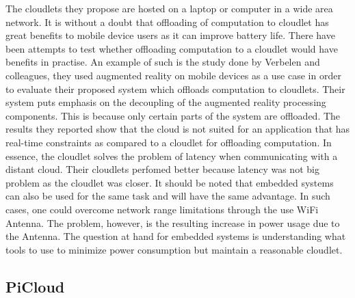 \noindent The cloudlets they propose are hosted on a laptop or computer in a wide area network. It is without a doubt that offloading of computation to cloudlet has great benefits to mobile device users as it can improve battery life. There have been attempts to test
whether offloading computation to a cloudlet would have benefits in practise. An example of such is the study done by Verbelen and colleagues\cite{RefWorks:93}, they used augmented reality on mobile devices as a use case in order to evaluate their proposed system which offloads computation to cloudlets. Their system puts emphasis on the decoupling of the augmented reality processing components.
This is because only certain parts of the system are offloaded. The results they reported show that the cloud is not suited for an application that has real-time constraints as compared to a cloudlet for offloading computation. In essence, the cloudlet solves the problem of latency when communicating with a distant cloud. Their cloudlets perfomed better because latency was not big problem as the cloudlet was closer. It should be noted that embedded systems can also be used for the same task and will have the same advantage. In such cases, one could overcome network range limitations through the use WiFi Antenna. The problem, however, is the resulting increase in power usage due to the Antenna. The question at hand for embedded systems is understanding what tools to use to minimize power consumption but maintain a reasonable cloudlet.\newline

\subsection{PiCloud}

